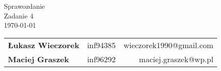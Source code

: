 \thispagestyle{empty}
\begin{center}
{\LARGE{Sprawozdanie\\}}
{\large{Zadanie 4\\}}
\vspace{3ex}
\today\\
\vspace{3ex}
\begin{tabular}{llr}
\textbf{Łukasz Wieczorek} & inf94385 & wieczorek1990@gmail.com\\
\textbf{Maciej Graszek} & inf96292 & maciej.graszek@wp.pl\\
\end{tabular}
\end{center}
\newpage